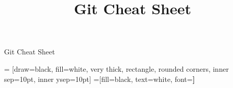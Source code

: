 \documentclass[a4paper]{article}
\title{Git Cheat Sheet}
\begin{document}
\begin{center}
	\Large{Git Cheat Sheet} \\
\end{center}

\footnotesize
\begin{multicols*}{3}

 = [draw=black, fill=white, very thick,
    rectangle, rounded corners, inner sep=10pt, inner ysep=10pt]
 =[fill=black, text=white, font=\bfseries]




\end{multicols*}
\end{document}
